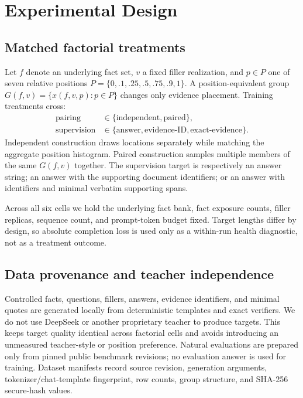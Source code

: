 \documentclass[11pt]{article}
\begin{document}
\section{Experimental Design}

\subsection{Matched factorial treatments}

Let $f$ denote an underlying fact set, $v$ a fixed filler realization, and $p\in P$ one of seven relative positions $P=\{0,.1,.25,.5,.75,.9,1\}$. A position-equivalent group $G(f,v)=\{x(f,v,p):p\in P\}$ changes only evidence placement. Training treatments cross:
\begin{align*}
\text{pairing} &\in \{\text{independent},\text{paired}\},\\
\text{supervision} &\in \{\text{answer},\text{evidence-ID},\text{exact-evidence}\}.
\end{align*}
Independent construction draws locations separately while matching the aggregate position histogram. Paired construction samples multiple members of the same $G(f,v)$ together. The supervision target is respectively an answer string; an answer with the supporting document identifiers; or an answer with identifiers and minimal verbatim supporting spans.

Across all six cells we hold the underlying fact bank, fact exposure counts, filler replicas, sequence count, and prompt-token budget fixed. Target lengths differ by design, so absolute completion loss is used only as a within-run health diagnostic, not as a treatment outcome.

\subsection{Data provenance and teacher independence}

Controlled facts, questions, fillers, answers, evidence identifiers, and minimal quotes are generated locally from deterministic templates and exact verifiers. We do not use DeepSeek or another proprietary teacher to produce targets. This keeps target quality identical across factorial cells and avoids introducing an unmeasured teacher-style or position preference. Natural evaluations are prepared only from pinned public benchmark revisions; no evaluation answer is used for training. Dataset manifests record source revision, generation arguments, tokenizer/chat-template fingerprint, row counts, group structure, and SHA-256 secure-hash values.
\end{document}
